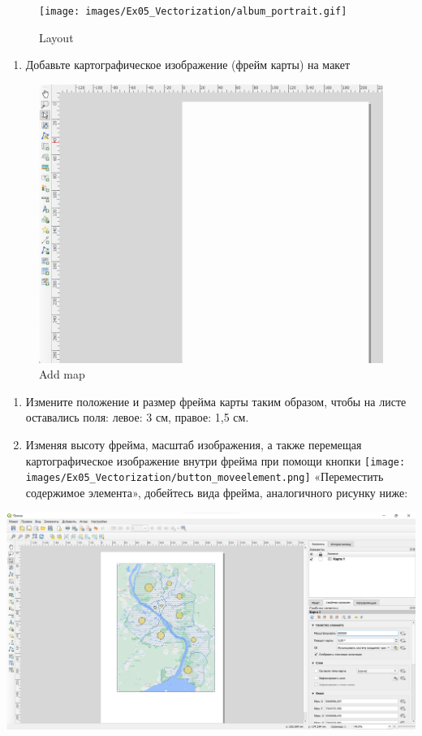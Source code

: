 \documentclass[
  12pt,
]{book}
\providecommand{\tightlist}{%
  \setlength{\itemsep}{0pt}\setlength{\parskip}{0pt}}
\begin{document}
\begin{figure}
\centering
\texttt{[image: images/Ex05\_Vectorization/album\_portrait.gif]}
\caption{Layout}
\end{figure}

\begin{enumerate}
\def\labelenumi{\arabic{enumi}.}
\setcounter{enumi}{3}
\tightlist
\item
  Добавьте картографическое изображение (фрейм карты) на макет
\end{enumerate}

\begin{figure}
\centering
\includegraphics{images/Ex05_Vectorization/add_map.gif}
\caption{Add map}
\end{figure}

\begin{enumerate}
\def\labelenumi{\arabic{enumi}.}
\setcounter{enumi}{4}
\item
  Измените положение и размер фрейма карты таким образом, чтобы на листе оставались поля: левое: 3 см, правое: 1,5 см.
\item
  Изменяя высоту фрейма, масштаб изображения, а также перемещая картографическое изображение внутри фрейма при помощи кнопки \texttt{[image: images/Ex05\_Vectorization/button\_moveelement.png]} «Переместить содержимое элемента», добейтесь вида фрейма, аналогичного рисунку ниже:
\end{enumerate}

\includegraphics{images/Ex05_Vectorization/map_frame.png}
\end{document}
